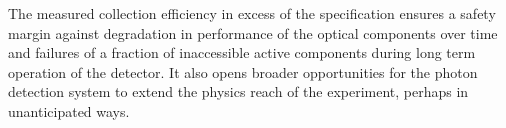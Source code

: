 The measured collection efficiency in excess of the specification ensures a safety margin against degradation in performance of the optical components over time and failures of a fraction of inaccessible active components during long term operation of the detector. It also opens broader opportunities for the photon detection system to extend the physics reach of the experiment, perhaps in unanticipated ways.

